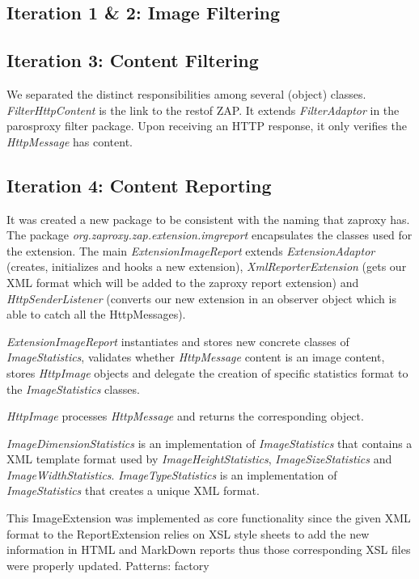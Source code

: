 \subsection{Iteration 1 \& 2: Image Filtering}
\subsection{Iteration 3: Content Filtering}
We separated the distinct responsibilities among several (object) classes. \textit{FilterHttpContent} is the link to the restof ZAP. It extends \textit{FilterAdaptor} in the parosproxy filter package. Upon receiving an HTTP response, it only verifies the \textit{HttpMessage} has content.
\subsection{Iteration 4: Content Reporting}
It was created a new package to be consistent with the naming that zaproxy has. The package \textit{org.zaproxy.zap.extension.imgreport} encapsulates the classes used for the extension. The main \textit{ExtensionImageReport} extends \textit{ExtensionAdaptor} (creates, initializes and hooks a new extension), \textit{XmlReporterExtension} (gets our XML format which will be added to the zaproxy report extension) and \textit{HttpSenderListener} (converts our new extension in an observer object which is able to catch all the HttpMessages).
\par
\textit{ExtensionImageReport} instantiates and stores new concrete classes of \textit{ImageStatistics}, validates whether \textit{HttpMessage} content is an image content, stores \textit{HttpImage} objects and delegate the creation of specific statistics format to the \textit{ImageStatistics} classes. 
\par
\textit{HttpImage} processes \textit{HttpMessage} and returns the corresponding object.
\par
\textit{ImageDimensionStatistics} is an implementation of \textit{ImageStatistics} that contains a XML template format used by \textit{ImageHeightStatistics}, \textit{ImageSizeStatistics} and \textit{ImageWidthStatistics}. \textit{ImageTypeStatistics} is an implementation of \textit{ImageStatistics} that creates a unique XML format.
\par
This ImageExtension was implemented as core functionality since the given XML format to the ReportExtension relies on XSL style sheets to add the new information in HTML and MarkDown reports thus those corresponding XSL files were properly updated.
Patterns: factory
